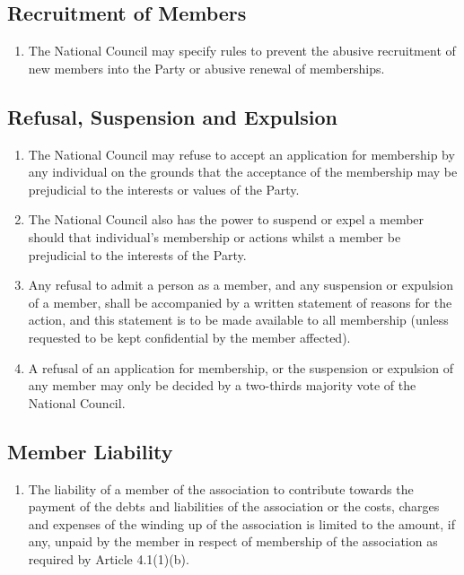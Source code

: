 \documentclass[a4paper,titlepage,8.5pt]{article}
\begin{document}
\subsection{Recruitment of Members}

\begin{enumerate}
\item The National Council may specify rules to prevent the abusive recruitment of new members into the Party or abusive renewal of memberships.
\end{enumerate}

\subsection{Refusal, Suspension and Expulsion}

\begin{enumerate}
\item The National Council may refuse to accept an application for membership by any individual on the grounds that the acceptance of the membership may be prejudicial to the interests or values of the Party.
\item The National Council also has the power to suspend or expel a member should that individual’s membership or actions whilst a member be prejudicial to the interests of the Party.
\item Any refusal to admit a person as a member, and any suspension or expulsion of a member, shall be accompanied by a written statement of reasons for the action, and this statement is to be made available to all membership (unless requested to be kept confidential by the member affected).
\item A refusal of an application for membership, or the suspension or expulsion of any member may only be decided by a two-thirds majority vote of the National Council.
\end{enumerate}

\subsection{Member Liability}

\begin{enumerate}
\item The liability of a member of the association to contribute towards the payment of the debts and liabilities of the association or the costs, charges and expenses of the winding up of the association is limited to the amount, if any, unpaid by the member in respect of membership of the association as required by Article 4.1(1)(b).
\end{enumerate}
\end{document}
